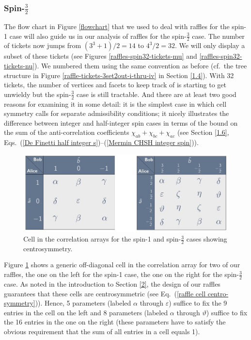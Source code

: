 \subsubsection{Spin-$\frac32$} \label{2.2.3}


The flow chart in Figure \ref{flowchart} that we used to deal with raffles for the spin-1 case will also guide us in our analysis of raffles for the spin-$\frac32$ case. The number of tickets now jumps from $(3^3 +1)/2 = 14$ to $4^3/2 = 32$. We will only display a subset of these tickets (see Figures \ref{raffles-spin32-tickets-mu} and \ref{raffles-spin32-tickets-nu}). We numbered them using the same convention as before (cf.\ the tree structure in Figure \ref{raffle-tickets-3set2out-i-thru-iv} in Section \ref{1.4}). With 32 tickets, the number of vertices and facets to keep track of is starting to get unwieldy but the spin-$\frac32$ case is still tractable. And there are at least two good reasons for examining it in some detail: it is the simplest case in which cell symmetry calls for separate admissibility conditions; it nicely illustrates the difference between integer and half-integer spin cases in terms of the bound on the sum of the anti-correlation coefficients $\chi_{ab} + \chi_{bc} + \chi_{ac}$ (see Section \ref{1.6}, Eqs.\ (\ref{De Finetti half integer s})--(\ref{Mermin CHSH integer spin})).

\begin{figure}[ht]
 \centering
   \includegraphics[width=4.5in]{symmetry-spin-1-32.jpeg} 
   \caption{Cell in the correlation arrays for the spin-1 and spin-$\frac32$ cases showing centrosymmetry.}
   \label{symmetry-spin-1-32}
\end{figure}

Figure \ref{symmetry-spin-1-32} shows a generic off-diagonal cell in the correlation array for two of our raffles, the one on the left for the spin-1 case, the one on the right for the spin-$\frac32$ case. As noted in the introduction to Section \ref{2}, the design of our raffles guarantees that these cells are centrosymmetric (see Eq.\ (\ref{raffle cell centro-symmetry})). Hence, 5 parameters (labeled $\alpha$ through $\varepsilon$) suffice to fix the 9 entries in the cell on the left and 8 parameters (labeled $\alpha$ through $\vartheta$) suffice to fix the 16 entries in the one on the right (these parameters have to satisfy the obvious requirement that the sum of all entries in a cell equals 1). 

